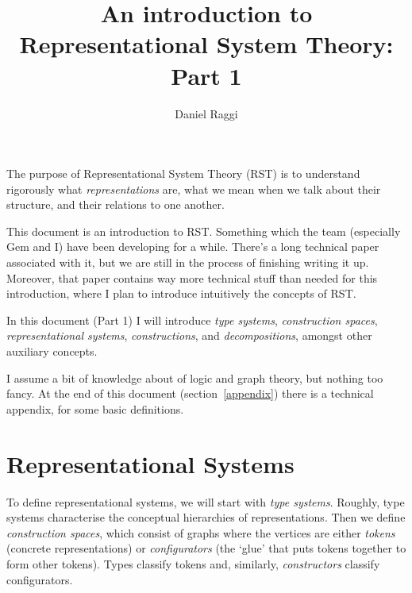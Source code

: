 \documentclass[a4paper]{article}
\title{An introduction to Representational System Theory: Part 1}
\author{Daniel Raggi}
\theoremstyle{definition}
\begin{document}
	\maketitle

	The purpose of Representational System Theory (RST) is to understand rigorously what \textit{representations} are, what we mean when we talk about their structure, and their relations to one another.

	This document is an introduction to RST. Something which the team (especially Gem and I) have been developing for a while. There's a long technical paper associated with it, but we are still in the process of finishing writing it up. Moreover, that paper contains way more technical stuff than needed for this introduction, where I plan to introduce intuitively the concepts of RST.

	In this document (Part 1) I will introduce \textit{type systems}, \textit{construction spaces}, \textit{representational systems}, \textit{constructions}, and \textit{decompositions}, amongst other auxiliary concepts.

	I assume a bit of knowledge about of logic and graph theory, but nothing too fancy. At the end of this document (section~\ref{appendix}) there is a technical appendix, for some basic definitions.


	\section{Representational Systems}
	To define representational systems, we will start with \textit{type systems}. Roughly, type systems characterise the conceptual hierarchies of representations. Then we define \textit{construction spaces}, which consist of graphs where the vertices are either \textit{tokens} (concrete representations) or \textit{configurators} (the `glue' that puts tokens together to form other tokens). Types classify tokens and, similarly, \textit{constructors} classify configurators.
\end{document}
